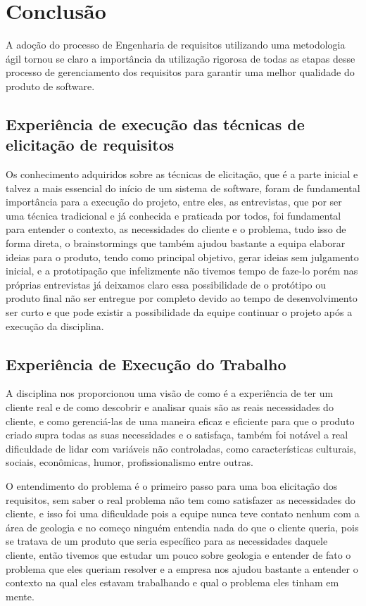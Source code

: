 \chapter{Conclusão}

  A adoção do processo de Engenharia de requisitos utilizando uma metodologia ágil tornou se claro a import\^{a}ncia da utilização rigorosa de
  todas as etapas desse processo de gerenciamento dos requisitos para garantir uma melhor qualidade do produto de software.

\section{Experiência de execução das técnicas de elicitação de requisitos}

  Os conhecimento adquiridos sobre as técnicas de elicitação, que é a parte inicial e talvez a mais essencial do início de um sistema de
  software, foram de fundamental import\^{a}ncia para a execução do projeto, entre eles, as entrevistas, que por ser uma técnica tradicional e
  já conhecida e praticada por todos, foi fundamental para entender o contexto, as necessidades do cliente e o problema, tudo isso de forma
  direta, o brainstormings que também ajudou bastante a equipa elaborar ideias para o produto, tendo como principal objetivo, gerar ideias sem
  julgamento inicial, e a prototipação que infelizmente não tivemos tempo de faze-lo porém nas próprias entrevistas já deixamos claro essa
  possibilidade de o protótipo ou produto final não ser entregue por completo devido ao tempo de desenvolvimento ser curto e que pode existir a
  possibilidade da equipe continuar o projeto após a execução da disciplina.

\section{Experiência de Execução do Trabalho}

  A disciplina nos proporcionou uma visão de como é a experiência de ter um cliente real e de como descobrir e analisar quais são as reais
  necessidades do cliente, e como gerenciá-las de uma maneira eficaz e eficiente para que o produto criado supra todas as suas necessidades e o
  satisfaça, também foi notável a real dificuldade de lidar com variáveis não controladas, como características culturais, sociais,
  econômicas, humor, profissionalismo entre outras.


  O entendimento do problema é o primeiro passo para uma boa elicitação dos requisitos, sem saber o real problema não tem como satisfazer as
  necessidades do cliente, e isso foi uma dificuldade pois a equipe nunca teve contato nenhum com a área de geologia e no começo ninguém
  entendia nada do que o cliente queria, pois se tratava de um produto que seria específico para as necessidades daquele cliente, então tivemos
  que estudar um pouco sobre geologia e entender de fato o problema que eles queriam resolver e a empresa nos ajudou bastante a entender o
  contexto na qual eles estavam trabalhando e qual o problema eles tinham em mente.



